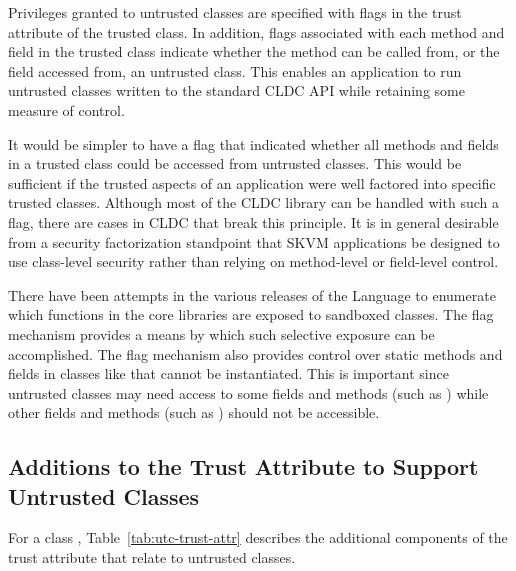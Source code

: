 \documentclass{llncs}
\begin{document}
Privileges granted to untrusted classes are specified with flags in the
trust attribute of the trusted class. In addition, flags associated with
each method and field in the trusted class indicate whether the method
can be called from, or the field accessed from, an untrusted class. This
enables an application to run untrusted classes written to the standard
CLDC API while retaining some measure of control.

It would be simpler to have a flag that indicated whether all methods
and fields in a trusted class could be accessed from untrusted classes.
This would be sufficient if the trusted aspects of an application were
well factored into specific trusted classes. Although most of the CLDC
library can be handled with such a flag, there are cases in CLDC that
break this principle. It is in general desirable from a security
factorization standpoint that SKVM applications be designed to use
class-level security rather than relying on method-level or field-level
control.

There have been attempts in the various releases of the Language to
enumerate which functions in the core libraries are exposed to sandboxed
classes. The flag mechanism provides a means by which such selective
exposure can be accomplished. The flag mechanism also provides control
over static methods and fields in classes like  that cannot be
instantiated. This is important since untrusted classes may need access
to some fields and methods (such as ) while other fields and
methods (such as ) should not be accessible.

\subsection{Additions to the Trust Attribute to Support Untrusted Classes}

For a class , Table~\ref{tab:utc-trust-attr} describes the additional
components of the trust attribute that relate to untrusted classes.
\end{document}
